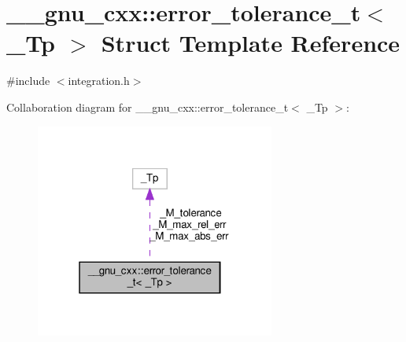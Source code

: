 \hypertarget{struct____gnu__cxx_1_1error__tolerance__t}{}\section{\+\_\+\+\_\+gnu\+\_\+cxx\+:\+:error\+\_\+tolerance\+\_\+t$<$ \+\_\+\+Tp $>$ Struct Template Reference}
\label{struct____gnu__cxx_1_1error__tolerance__t}


{\ttfamily \#include $<$integration.\+h$>$}



Collaboration diagram for \+\_\+\+\_\+gnu\+\_\+cxx\+:\+:error\+\_\+tolerance\+\_\+t$<$ \+\_\+\+Tp $>$\+:
\nopagebreak
\begin{figure}[H]
\begin{center}
\leavevmode
\includegraphics[width=223pt]{struct____gnu__cxx_1_1error__tolerance__t__coll__graph}
\end{center}
\end{figure}
